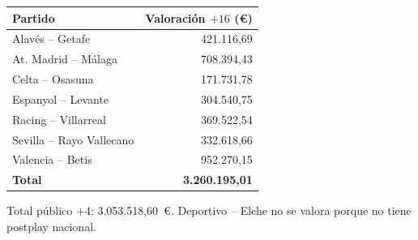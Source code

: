 \documentclass[11pt,a4paper]{article}
\begin{document}
\begin{center}
\begin{tabular}{lr}
\toprule
Partido & Valoración $+16$ (€) \\
\midrule
Alavés -- Getafe            & 421.116,69 \\
At. Madrid -- Málaga        & 708.394,43 \\
Celta -- Osasuna            & 171.731,78 \\
Espanyol -- Levante         & 304.540,75 \\
Racing -- Villarreal        & 369.522,54 \\
Sevilla -- Rayo Vallecano   & 332.618,66 \\
Valencia -- Betis           & 952.270,15 \\
\midrule
\textbf{Total}              & \textbf{3.260.195,01} \\
\bottomrule
\end{tabular}
\end{center}

Total público $+4$: 3.053.518,60~€. Deportivo -- Elche no se valora porque no tiene postplay nacional.
\end{document}
